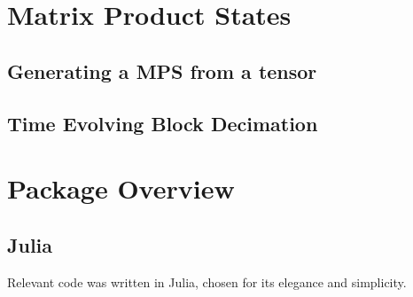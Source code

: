 \documentclass[12pt]{article}
\begin{document}
\begin{multicols}{2}
\section*{Matrix Product States}
	\subsection*{Generating a MPS from a tensor}
	\subsection*{Time Evolving Block Decimation}
\section*{Package Overview}
	\subsection*{Julia}
		Relevant code was written in Julia, chosen for its elegance and simplicity.

\end{multicols}


\end{document}

